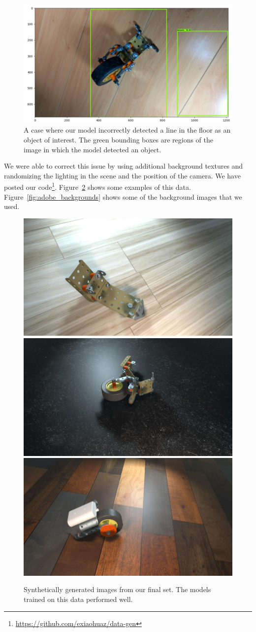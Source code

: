 \begin{figure}
  \includegraphics[width=\columnwidth]{figures/synthetic/false_positive.png}
  \caption{
    A case where our model incorrectly detected a line in the floor as an
    object of interest.
    The green bounding boxes are regions of the image in which the model
    detected an object.
  }\label{fig:false_positive}
\end{figure}

We were able to correct this issue by using additional background textures and
randomizing the lighting in the scene and the position of the camera.
We have posted our code\footnote{\url{https://github.com/exiaohuaz/data-gen}}.
Figure~\ref{fig:good_data} shows some examples of this data.
Figure~\ref{fig:adobe_backgrounds} shows some of the background images that we
used.

\begin{figure}
  \includegraphics[width=0.5\columnwidth]{figures/synthetic/floor1.jpg}
  \includegraphics[width=0.5\columnwidth]{figures/synthetic/floor2.jpg}
  \includegraphics[width=0.5\columnwidth]{figures/synthetic/floor3.jpg}
  \caption{
    Synthetically generated images from our final set. The models trained on
    this data performed well.
  }\label{fig:good_data}
\end{figure}

